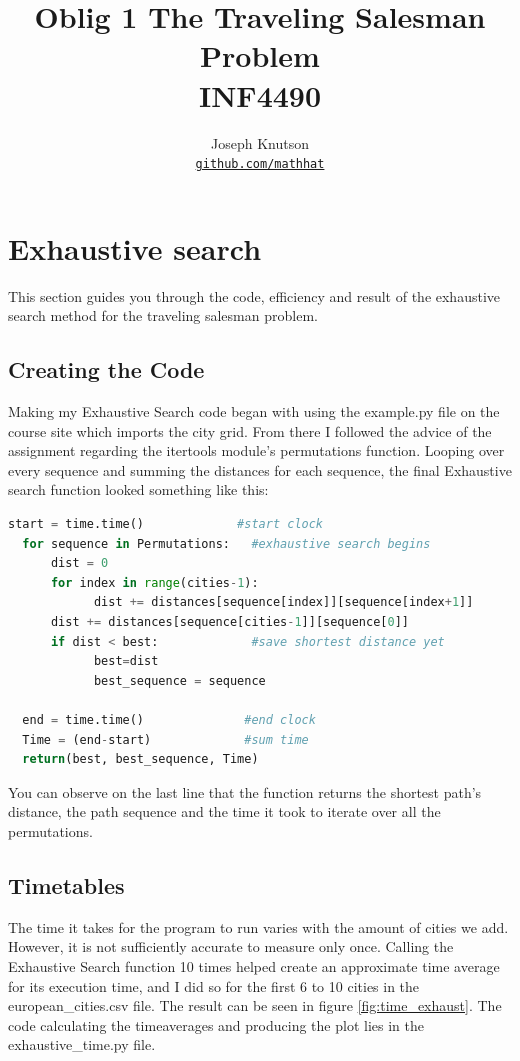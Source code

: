 \documentclass[10pt, a4paper]{article}
\title{Oblig 1 The Traveling Salesman Problem \\
  \hrulefill\small{ INF4490 }\hrulefill}
\author{Joseph Knutson \\
\href{https://github.com/mathhat/}{\texttt{github.com/mathhat}}}
\begin{document}
\maketitle
\tableofcontents
\clearpage
\section{Exhaustive search}
This section guides you through the code, efficiency and result of the exhaustive search method for the traveling salesman problem.
\subsection{Creating the Code}
Making my Exhaustive Search code began with using the example.py file on the course site which imports the city grid.
From there I followed the advice of the assignment regarding the itertools module's permutations function. Looping over every sequence and summing the distances for each sequence, the final Exhaustive search function looked something like this:
\begin{lstlisting}[language = Python]
  start = time.time()             #start clock
  for sequence in Permutations:   #exhaustive search begins
      dist = 0
      for index in range(cities-1):
	        dist += distances[sequence[index]][sequence[index+1]]
      dist += distances[sequence[cities-1]][sequence[0]]
      if dist < best:             #save shortest distance yet
	        best=dist
	        best_sequence = sequence

  end = time.time()              #end clock
  Time = (end-start)             #sum time
  return(best, best_sequence, Time)
\end{lstlisting}
You can observe on the last line that the function returns the shortest path's distance, the path sequence and the time it took to iterate over all the permutations.
\subsection{Timetables}
The time it takes for the program to run varies with the amount of cities we add. However, it is not sufficiently accurate to measure only once.
Calling the Exhaustive Search function 10 times helped create an approximate time average for its execution time, and I did so for the first 6 to 10 cities in the european\_cities.csv file. 
The result can be seen in figure \ref{fig:time_exhaust}. The code calculating the timeaverages and producing the plot lies in the exhaustive\_time.py file.
\end{document}

